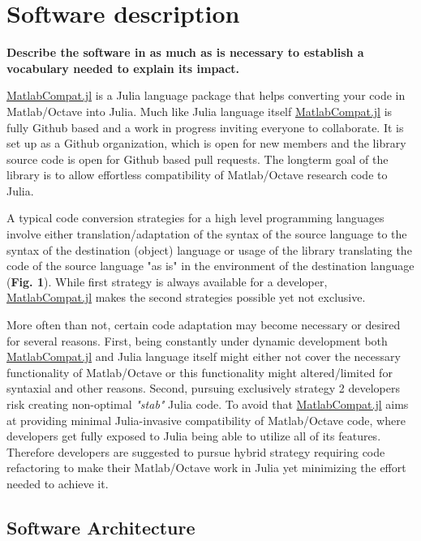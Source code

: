 \section{Software description}


\textbf{Describe the software in as much as is necessary to establish a vocabulary needed to explain its impact. }

\href{https://github.com/MatlabCompat/MatlabCompat.jl}{MatlabCompat.jl} is a Julia language package that helps converting your code in Matlab/Octave into Julia. Much like Julia language itself \href{https://github.com/MatlabCompat/MatlabCompat.jl}{MatlabCompat.jl} is fully Github based and a work in progress inviting everyone to collaborate. It is set up as a Github organization, which is open for new members and the library source code is open for Github based pull requests. The longterm goal of the library is to allow effortless compatibility of Matlab/Octave research code to Julia.

A typical code conversion strategies for a high level programming languages involve either translation/adaptation of the syntax of the source language to the syntax of the destination (object) language \cite{Ledley_1962} or usage of the library translating the code of the source language "as is" in the environment of the destination language (\textbf{Fig. 1}). While first strategy is always available for a developer, \href{https://github.com/MatlabCompat/MatlabCompat.jl}{MatlabCompat.jl} makes the second strategies possible yet not exclusive.

More often than not, certain code adaptation may become necessary or desired for several reasons. First, being constantly under dynamic development both \href{https://github.com/MatlabCompat/MatlabCompat.jl}{MatlabCompat.jl} and Julia language itself might either not cover the necessary functionality of Matlab/Octave or this functionality might altered/limited for syntaxial and other reasons. Second, pursuing exclusively strategy 2 developers risk creating non-optimal \textit{"stab"} Julia code. To avoid that \href{https://github.com/MatlabCompat/MatlabCompat.jl}{MatlabCompat.jl} aims at providing minimal Julia-invasive compatibility of Matlab/Octave code, where developers get fully exposed to Julia being able to utilize all of its features. Therefore developers are suggested to pursue hybrid strategy requiring code refactoring to make their Matlab/Octave work in Julia yet minimizing the effort needed to achieve it.

\subsection{Software Architecture}
\label{Architecture} 

